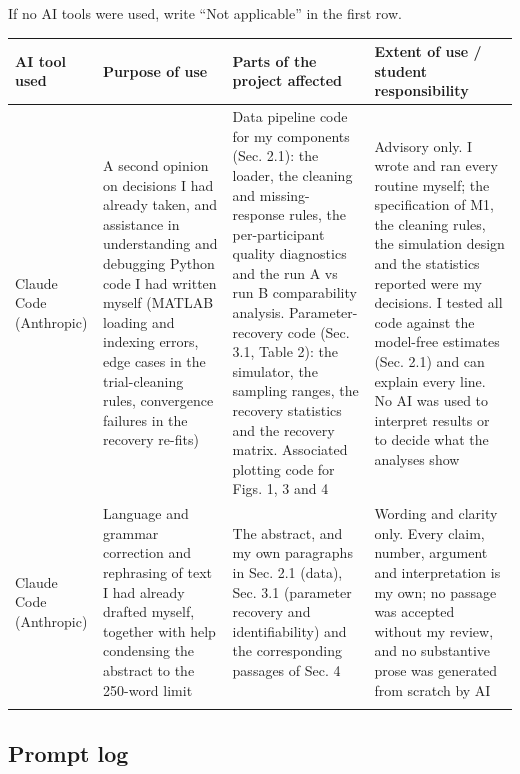 \documentclass[11pt]{article}
\begin{document}
If no AI tools were used, write ``Not applicable'' in the first row.

\medskip

\begin{tabularx}{\textwidth}{|
>{\raggedright\arraybackslash}X|
>{\raggedright\arraybackslash}X|
>{\raggedright\arraybackslash}X|
>{\raggedright\arraybackslash}X|}
\hline
\textbf{AI tool used} &
\textbf{Purpose of use} &
\textbf{Parts of the project affected} &
\textbf{Extent of use / student responsibility} \\
\hline
Claude Code (Anthropic) &
A second opinion on decisions I had already taken, and assistance in understanding and
debugging Python code I had written myself (MATLAB loading and indexing errors, edge cases in
the trial-cleaning rules, convergence failures in the recovery re-fits) &
Data pipeline code for my components (Sec. 2.1): the loader, the cleaning and missing-response
rules, the per-participant quality diagnostics and the run A vs run B comparability analysis.
Parameter-recovery code (Sec. 3.1, Table 2): the simulator, the sampling ranges, the recovery
statistics and the recovery matrix. Associated plotting code for Figs. 1, 3 and 4 &
Advisory only. I wrote and ran every routine myself; the specification of M1, the cleaning
rules, the simulation design and the statistics reported were my decisions. I tested all code
against the model-free estimates (Sec. 2.1) and can explain every line. No AI was used to
interpret results or to decide what the analyses show \\
[0.4em]
\hline
Claude Code (Anthropic) &
Language and grammar correction and rephrasing of text I had already drafted myself, together
with help condensing the abstract to the 250-word limit &
The abstract, and my own paragraphs in Sec. 2.1 (data), Sec. 3.1 (parameter recovery and
identifiability) and the corresponding passages of Sec. 4 &
Wording and clarity only. Every claim, number, argument and interpretation is my own; no
passage was accepted without my review, and no substantive prose was generated from scratch by
AI \\
[0.4em]
\hline
 & & & \\
[0.4em]
\hline
\end{tabularx}

\bigskip

\subsection*{Prompt log}
\end{document}
